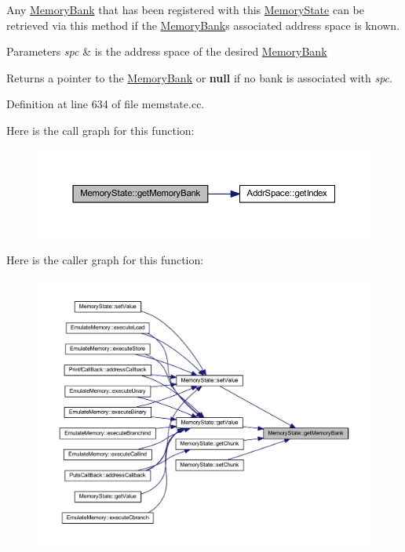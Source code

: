 Any \mbox{\hyperlink{class_memory_bank}{Memory\+Bank}} that has been registered with this \mbox{\hyperlink{class_memory_state}{Memory\+State}} can be retrieved via this method if the \mbox{\hyperlink{class_memory_bank}{Memory\+Bank}}\textquotesingle{}s associated address space is known. 
\begin{DoxyParams}{Parameters}
{\em spc} & is the address space of the desired \mbox{\hyperlink{class_memory_bank}{Memory\+Bank}} \\
\hline
\end{DoxyParams}
\begin{DoxyReturn}{Returns}
a pointer to the \mbox{\hyperlink{class_memory_bank}{Memory\+Bank}} or {\bfseries{null}} if no bank is associated with {\itshape spc}. 
\end{DoxyReturn}


Definition at line 634 of file memstate.\+cc.

Here is the call graph for this function\+:
\nopagebreak
\begin{figure}[H]
\begin{center}
\leavevmode
\includegraphics[width=350pt]{class_memory_state_abf51909f3b3b47db085f754680445b62_cgraph}
\end{center}
\end{figure}
Here is the caller graph for this function\+:
\nopagebreak
\begin{figure}[H]
\begin{center}
\leavevmode
\includegraphics[width=350pt]{class_memory_state_abf51909f3b3b47db085f754680445b62_icgraph}
\end{center}
\end{figure}
\mbox{\label{class_memory_state_aefbe63d695c36756cbc16d09bea76677}} 
